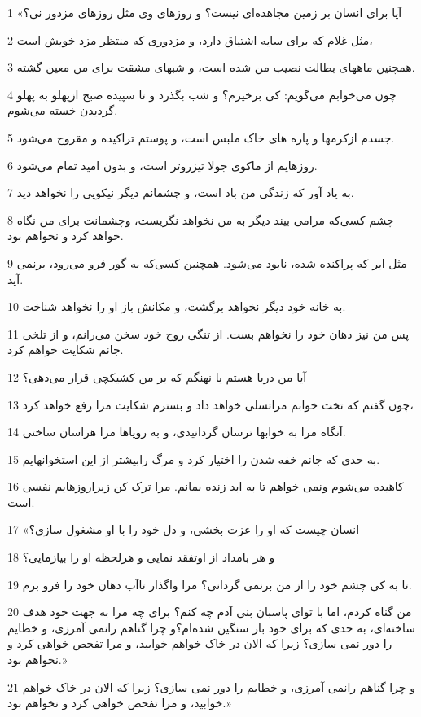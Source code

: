 \par 1 «آیا برای انسان بر زمین مجاهده‌ای نیست؟ و روزهای وی مثل روزهای مزدور نی؟
\par 2 مثل غلام که برای سایه اشتیاق دارد، و مزدوری که منتظر مزد خویش است،
\par 3 همچنین ماههای بطالت نصیب من شده است، و شبهای مشقت برای من معین گشته.
\par 4 چون می‌خوابم می‌گویم: کی برخیزم؟ و شب بگذرد و تا سپیده صبح ازپهلو به پهلو گردیدن خسته می‌شوم.
\par 5 جسدم ازکرمها و پاره های خاک ملبس است، و پوستم تراکیده و مقروح می‌شود.
\par 6 روزهایم از ماکوی جولا تیزروتر است، و بدون امید تمام می‌شود.
\par 7 به یاد آور که زندگی من باد است، و چشمانم دیگر نیکویی را نخواهد دید.
\par 8 چشم کسی‌که مرامی بیند دیگر به من نخواهد نگریست، وچشمانت برای من نگاه خواهد کرد و نخواهم بود.
\par 9 مثل ابر که پراکنده شده، نابود می‌شود. همچنین کسی‌که به گور فرو می‌رود، برنمی آید.
\par 10 به خانه خود دیگر نخواهد برگشت، و مکانش باز او را نخواهد شناخت.
\par 11 پس من نیز دهان خود را نخواهم بست. از تنگی روح خود سخن می‌رانم، و از تلخی جانم شکایت خواهم کرد.
\par 12 آیا من دریا هستم یا نهنگم که بر من کشیکچی قرار می‌دهی؟
\par 13 چون گفتم که تخت خوابم مراتسلی خواهد داد و بسترم شکایت مرا رفع خواهد کرد،
\par 14 آنگاه مرا به خوابها ترسان گردانیدی، و به رویاها مرا هراسان ساختی.
\par 15 به حدی که جانم خفه شدن را اختیار کرد و مرگ رابیشتر از این استخوانهایم.
\par 16 کاهیده می‌شوم ونمی خواهم تا به ابد زنده بمانم. مرا ترک کن زیراروزهایم نفسی است.
\par 17 «انسان چیست که او را عزت بخشی، و دل خود را با او مشغول سازی؟
\par 18 و هر بامداد از اوتفقد نمایی و هرلحظه او را بیازمایی؟
\par 19 تا به کی چشم خود را از من برنمی گردانی؟ مرا واگذار تاآب دهان خود را فرو برم.
\par 20 من گناه کردم، اما با تو‌ای پاسبان بنی آدم چه کنم؟ برای چه مرا به جهت خود هدف ساخته‌ای، به حدی که برای خود بار سنگین شده‌ام؟و چرا گناهم رانمی آمرزی، و خطایم را دور نمی سازی؟ زیرا که الان در خاک خواهم خوابید، و مرا تفحص خواهی کرد و نخواهم بود.»
\par 21 و چرا گناهم رانمی آمرزی، و خطایم را دور نمی سازی؟ زیرا که الان در خاک خواهم خوابید، و مرا تفحص خواهی کرد و نخواهم بود.»
 
